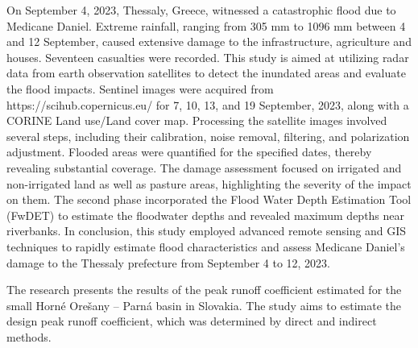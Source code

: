 On September 4, 2023, Thessaly, Greece, witnessed a catastrophic flood due to Medicane Daniel. Extreme rainfall, ranging from 305 mm to 1096 mm between 4 and 12 September, caused extensive damage to the infrastructure, agriculture and houses. Seventeen casualties were recorded. This study is aimed at utilizing radar data from earth observation satellites to detect the inundated areas and evaluate the flood impacts. Sentinel images were acquired from https://scihub.copernicus.eu/ for 7, 10, 13, and 19 September, 2023, along with a CORINE Land use/Land cover map. Processing the satellite images involved several steps, including their calibration, noise removal, filtering, and polarization adjustment. Flooded areas were quantified for the specified dates, thereby revealing substantial coverage. The damage assessment focused on irrigated and non-irrigated land as well as pasture areas, highlighting the severity of the impact on them. The second phase incorporated the Flood Water Depth Estimation Tool (FwDET) to estimate the floodwater depths and revealed maximum depths near riverbanks. In conclusion, this study employed advanced remote sensing and GIS techniques to rapidly estimate flood characteristics and assess Medicane Daniel's damage to the Thessaly prefecture from September 4 to 12, 2023.



\newpage{}
{}
\begin{flushleft}





\end{flushleft}

\noindent

The research presents the results of the peak runoff coefficient estimated for the small Horné Orešany – Parná basin in Slovakia. The study aims to estimate the design peak runoff coefficient, which was determined by direct and indirect methods.

